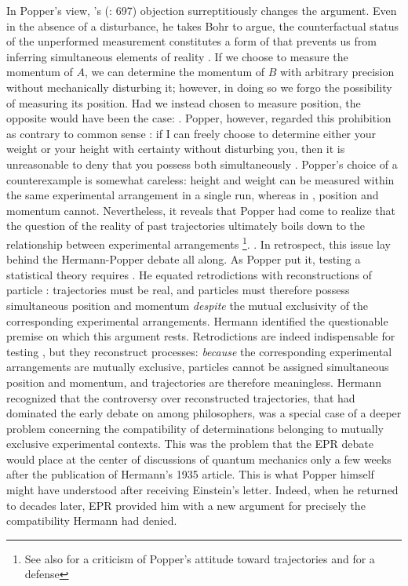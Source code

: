 \documentclass[pdflatex]{sn-jnl}
\renewcommand{\cite}{\citealp}
\renewcommand{\citets}[2][]{\citeauthor{#2}'s (\citeyear{#2}\if\relax\detokenize{#1}\relax\else: #1\fi)}
\begin{document}
In Popper's view, \citets[697]{Bohr1935} objection surreptitiously changes the argument. Even in the absence of a  disturbance, he takes Bohr to argue, the counterfactual status of the unperformed measurement constitutes a form of  that prevents us from inferring simultaneous elements of reality \citep[445]{Popper1959}. If we choose to measure the momentum of $A$, we can determine the momentum of $B$ with arbitrary precision without mechanically disturbing it; however, in doing so we forgo the possibility of measuring its position. Had we instead chosen to measure position, the opposite would have been the case:  \citep[149]{Popper1982}. Popper, however, regarded this prohibition as contrary to common sense \citep[150]{Popper1982}: if I can freely choose to determine either your weight or your height with certainty without disturbing you, then it is unreasonable to deny that you possess both simultaneously \citep[150]{Popper1982}. Popper's choice of a counterexample is somewhat careless: height and weight can be measured within the same experimental arrangement in a single run, whereas in \qm, position and momentum cannot. Nevertheless, it reveals that Popper had come to realize that the question of the reality of past trajectories ultimately boils down to the relationship between experimental arrangements \citep[54]{Howard2012}\footnote{See also \cite{Feyerabend1968,Feyerabend1969} for a criticism of Popper's attitude toward trajectories and \cite[366--67]{Ballentine1970} for a defense}.
.
In retrospect, this issue lay behind the Hermann-Popper debate all along. As Popper put it, testing a statistical theory requires . He equated retrodictions with reconstructions of particle : trajectories must be real, and particles must therefore possess simultaneous position and momentum \emph{despite} the mutual exclusivity of the corresponding experimental arrangements. Hermann identified the questionable premise on which this argument rests. Retrodictions are indeed indispensable for testing \qm, but they reconstruct  processes: \emph{because} the corresponding experimental arrangements are mutually exclusive, particles cannot be assigned simultaneous position and momentum, and trajectories are therefore meaningless. Hermann recognized that the controversy over reconstructed trajectories, that had dominated the early debate on \qm among philosophers, was a special case of a deeper problem concerning the compatibility of determinations belonging to mutually exclusive experimental contexts. This was the problem that the EPR debate would place at the center of discussions of quantum mechanics only a few weeks after the publication of Hermann's 1935 article. This is what Popper himself might have understood after receiving Einstein's letter. Indeed, when he returned to \qm decades later, EPR provided him with a new argument for precisely the compatibility Hermann had denied.
 
\end{document}
